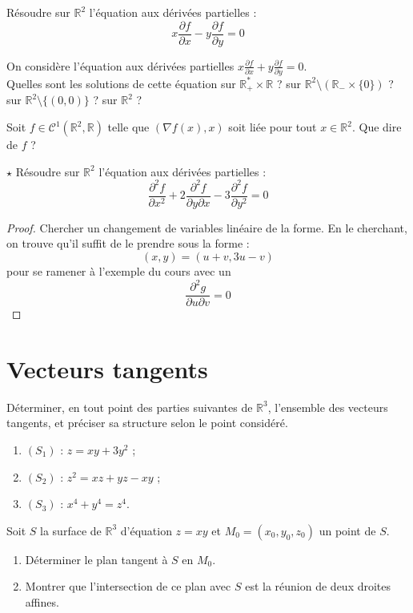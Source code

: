 \documentclass[french,a4paper]{article}
\newcommand{\R}{\mathbb{R}}
\newcommand{\st}{^*}
\theoremstyle{plain}
\theoremstyle{definition}
\theoremstyle{remark}
\begin{document}
\begin{ex}[Moulin.57]{}
	Résoudre sur $\R^2$ l'équation aux dérivées partielles : $$x\frac{\partial f}{\partial x}-y\frac{\partial f}{\partial y}=0$$
\end{ex}

\begin{ex}[Moulin.58]{}
	On considère l'équation aux dérivées partielles $\displaystyle x\frac{\partial f}{\partial x}+y\frac{\partial f}{\partial y}=0$. \\
	Quelles sont les solutions de cette équation sur $\R_+\st\times\R$ ? sur $\R^2\setminus(\R_-\times\{0\})$ ? sur $\R^2\setminus\{(0,0)\}$ ? sur $\R^2$ ?
\end{ex}

\begin{ex}[Moulin.59]{}
	Soit $f\in\mathcal{C}^1(\R^2,\R)$ telle que $(\nabla f(x),x)$ soit liée pour tout $x\in\R^2$. Que dire de $f$ ?
\end{ex}

\begin{ex}[Moulin.60]{$\star$}
	Résoudre sur $\R^2$ l'équation aux dérivées partielles : $$\frac{\partial^2 f}{\partial x^2}+2\frac{\partial^2 f}{\partial y\partial x}-3\frac{\partial^2f}{\partial y^2}=0$$
\end{ex}
\begin{proof}
	Chercher un changement de variables linéaire de la forme. En le cherchant, on trouve qu'il suffit de le prendre sous la forme : $$(x,y)=(u+v,3u-v)$$ pour se ramener à l'exemple du cours avec un $$\frac{\partial^2g}{\partial u\partial v}=0$$
\end{proof}

\section{Vecteurs tangents}

\begin{ex}[Moulin.61]{}
	Déterminer, en tout point des parties suivantes de $\R^3$, l'ensemble des vecteurs tangents, et préciser sa structure selon le point considéré.
	\begin{enumerate}
		\item $(S_1)$ : $z=xy+3y^2$ ;
		\item $(S_2)$ : $z^2=xz+yz-xy$ ;
		\item $(S_3)$ : $x^4+y^4=z^4$.
	\end{enumerate}
\end{ex}

\begin{ex}[Moulin.62]{}
	Soit $S$ la surface de $\R^3$ d'équation $z=xy$ et $M_0=(x_0,y_0,z_0)$ un point de $S$.
	\begin{enumerate}
		\item Déterminer le plan tangent à $S$ en $M_0$.
		\item Montrer que l'intersection de ce plan avec $S$ est la réunion de deux droites affines.
	\end{enumerate}
\end{ex}
\end{document}
